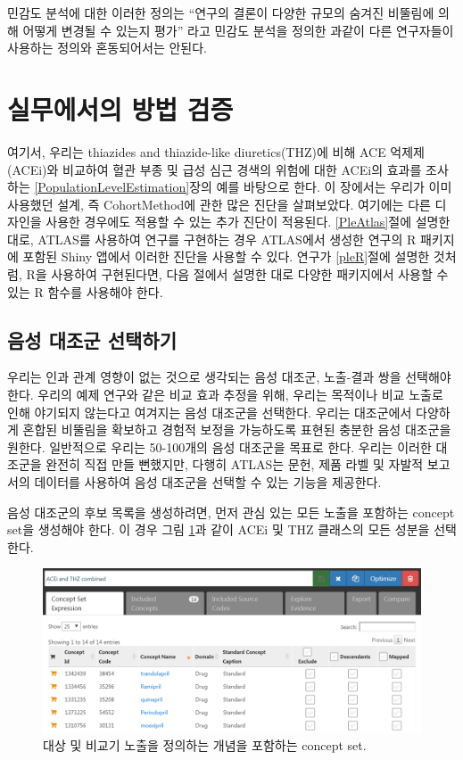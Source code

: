 \documentclass[11pt]{book}
\theoremstyle{definition}
\theoremstyle{definition}
\theoremstyle{definition}
\theoremstyle{remark}
\begin{document}
민감도 분석에 대한 이러한 정의는 ``연구의 결론이 다양한 규모의 숨겨진
비뚤림에 의해 어떻게 변경될 수 있는지 평가'' 라고 민감도 분석을 정의한
\citet{rosenbaum_2005} 과같이 다른 연구자들이 사용하는 정의와
혼동되어서는 안된다.

\section{실무에서의 방법 검증}\label{--}

여기서, 우리는 thiazides and thiazide-like diuretics(THZ)에 비해 ACE
억제제(ACEi)와 비교하여 혈관 부종 및 급성 심근 경색의 위험에 대한 ACEi의
효과를 조사하는 \ref{PopulationLevelEstimation}장의 예를 바탕으로 한다.
이 장에서는 우리가 이미 사용했던 설계, 즉 CohortMethod에 관한 많은
진단을 살펴보았다. 여기에는 다른 디자인을 사용한 경우에도 적용할 수 있는
추가 진단이 적용된다. \ref{PleAtlas}절에 설명한 대로, ATLAS를 사용하여
연구를 구현하는 경우 ATLAS에서 생성한 연구의 R 패키지에 포함된 Shiny
앱에서 이러한 진단을 사용할 수 있다. 연구가 \ref{pleR}절에 설명한
것처럼, R을 사용하여 구현된다면, 다음 절에서 설명한 대로 다양한
패키지에서 사용할 수 있는 R 함수를 사용해야 한다.

\subsection{음성 대조군 선택하기}\label{--}

우리는 인과 관계 영향이 없는 것으로 생각되는 음성 대조군, 노출-결과 쌍을
선택해야 한다. 우리의 예제 연구와 같은 비교 효과 추정을 위해, 우리는
목적이나 비교 노출로 인해 야기되지 않는다고 여겨지는 음성 대조군을
선택한다. 우리는 대조군에서 다양하게 혼합된 비뚤림을 확보하고 경험적
보정을 가능하도록 표현된 충분한 음성 대조군을 원한다. 일반적으로 우리는
50-100개의 음성 대조군을 목표로 한다. 우리는 이러한 대조군을 완전히 직접
만들 뻔했지만, 다행히 ATLAS는 문헌, 제품 라벨 및 자발적 보고서의
데이터를 사용하여 음성 대조군을 선택할 수 있는 기능을 제공한다.

음성 대조군의 후보 목록을 생성하려면, 먼저 관심 있는 모든 노출을
포함하는 concept set을 생성해야 한다. 이 경우 그림
\ref{fig:exposuresConceptSet}과 같이 ACEi 및 THZ 클래스의 모든 성분을
선택한다.

\begin{figure}

{\centering \includegraphics[width=1\linewidth]{images/MethodValidity/exposuresConceptSet} 

}

\caption{대상 및 비교기 노출을 정의하는 개념을 포함하는 concept set.}\label{fig:exposuresConceptSet}
\end{figure}
\end{document}
